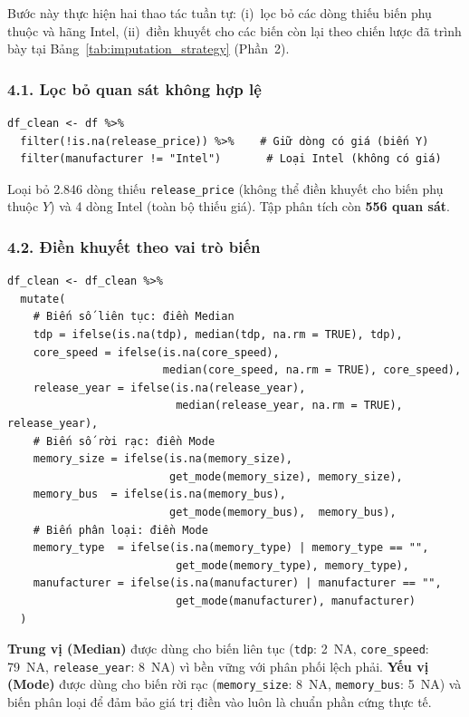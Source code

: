 \documentclass[a4paper]{article}
\begin{document}
Bước này thực hiện hai thao tác tuần tự: (i)~lọc bỏ các dòng thiếu biến phụ thuộc và hãng Intel, (ii)~điền khuyết cho các biến còn lại theo chiến lược đã trình bày tại Bảng~\ref{tab:imputation_strategy} (Phần~2).

\subsubsection*{4.1. Lọc bỏ quan sát không hợp lệ}

\begin{verbatim}
df_clean <- df %>%
  filter(!is.na(release_price)) %>%    # Giữ dòng có giá (biến Y)
  filter(manufacturer != "Intel")       # Loại Intel (không có giá)
\end{verbatim}

Loại bỏ 2.846 dòng thiếu \texttt{release\_price} (không thể điền khuyết cho biến phụ thuộc $Y$) và 4 dòng Intel (toàn bộ thiếu giá). Tập phân tích còn \textbf{556 quan sát}.

\subsubsection*{4.2. Điền khuyết theo vai trò biến}

\begin{verbatim}
df_clean <- df_clean %>%
  mutate(
    # Biến số liên tục: điền Median
    tdp = ifelse(is.na(tdp), median(tdp, na.rm = TRUE), tdp),
    core_speed = ifelse(is.na(core_speed),
                        median(core_speed, na.rm = TRUE), core_speed),
    release_year = ifelse(is.na(release_year),
                          median(release_year, na.rm = TRUE), release_year),
    # Biến số rời rạc: điền Mode
    memory_size = ifelse(is.na(memory_size),
                         get_mode(memory_size), memory_size),
    memory_bus  = ifelse(is.na(memory_bus),
                         get_mode(memory_bus),  memory_bus),
    # Biến phân loại: điền Mode
    memory_type  = ifelse(is.na(memory_type) | memory_type == "",
                          get_mode(memory_type), memory_type),
    manufacturer = ifelse(is.na(manufacturer) | manufacturer == "",
                          get_mode(manufacturer), manufacturer)
  )
\end{verbatim}

\textbf{Trung vị (Median)} được dùng cho biến liên tục (\texttt{tdp}: 2~NA, \texttt{core\_speed}: 79~NA, \texttt{release\_year}: 8~NA) vì bền vững với phân phối lệch phải. \textbf{Yếu vị (Mode)} được dùng cho biến rời rạc (\texttt{memory\_size}: 8~NA, \texttt{memory\_bus}: 5~NA) và biến phân loại để đảm bảo giá trị điền vào luôn là chuẩn phần cứng thực tế.
\end{document}
